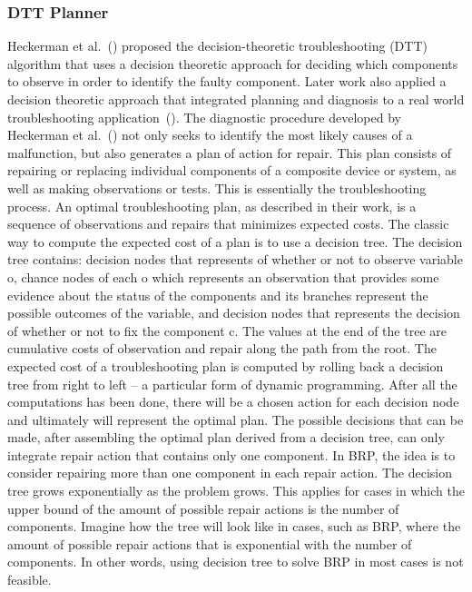 \documentclass[review]{elsarticle}
\newcommand\roni[1]{\textcolor{green}{roni: #1}}
\begin{document}
\subsubsection{DTT Planner}


Heckerman et al.~(\cite{heckerman1995decision}) proposed the decision-theoretic troubleshooting (DTT) algorithm that uses a decision theoretic approach for deciding which components to observe in order to identify the faulty component. Later work also applied a decision theoretic approach that integrated planning and diagnosis to a real world troubleshooting application~(\cite{Nyberg12,warnquist2009planning}). 
The diagnostic procedure developed by Heckerman et al.~(\cite{heckerman1995decision}) not only seeks to identify the most likely causes of a malfunction, but also generates a plan of action for repair. This plan consists of repairing or replacing individual components of a composite device or system, as well as making observations or tests. This is essentially the troubleshooting process. An optimal troubleshooting plan, as described in their work, is a sequence of observations and repairs that minimizes expected costs. The classic way to compute the expected cost of a plan is to use a decision tree. The decision tree contains: decision nodes that represents of whether or not to observe variable o, chance nodes of each o which represents an observation that provides some evidence about the status of the components and its branches represent the possible outcomes of the variable, and decision nodes that represents the decision of whether or not to fix the component c. The values at the end of the tree are cumulative costs of observation and repair along the path from the root. The expected cost of a troubleshooting plan is computed by rolling back a decision tree from right to left – a particular form of dynamic programming. After all the computations has been done, there will be a chosen action for each decision node and ultimately will represent the optimal plan. 
The possible decisions that can be made, after assembling the optimal plan derived from a decision tree, can only integrate repair action that contains only one component. In BRP, the idea is to consider repairing more than one component in each repair action. The decision tree grows exponentially as the problem grows. This applies for cases in which the upper bound of the amount of possible repair actions is the number of components. Imagine how the tree will look like in cases, such as BRP, where the amount of possible repair actions that is exponential with the number of components. In other words, using decision tree to solve BRP in most cases is not feasible. 
\end{document}
